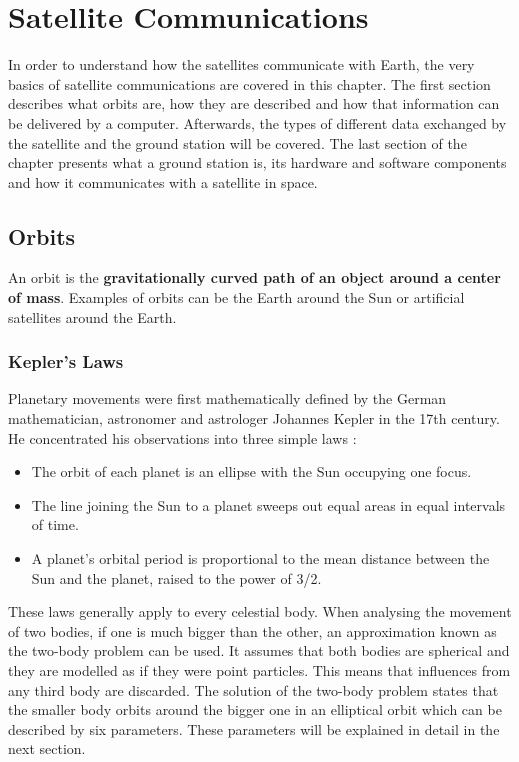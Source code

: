 

\chapter{Satellite Communications}

In order to understand how  the satellites communicate with Earth, the very basics of satellite communications are covered in this chapter. The first section describes what orbits are, how they are described and how that information can be delivered by a computer. Afterwards, the types of different data exchanged by the satellite and the ground station will be covered. The last section of the chapter presents what a ground station is, its hardware and software components and how it communicates with a satellite in space.


\section{Orbits}
An orbit is the \textbf{gravitationally curved path of an object around a center of mass}. Examples of orbits can be the Earth around the Sun or artificial satellites around the Earth.



\subsection{Kepler's Laws}
Planetary movements were first mathematically defined by the German mathematician, astronomer and astrologer Johannes Kepler in the 17th century. He concentrated his observations into three simple laws \citep{SSEng}:
\begin{itemize}

\item The orbit of each planet is an ellipse with the Sun occupying one focus.
\item The line joining the Sun to a planet sweeps out equal areas in equal intervals of time.
\item A planet's orbital period is proportional to the mean distance between the Sun and the planet, raised to the power of 3/2.
\end{itemize} 

These laws generally apply to every celestial body. When analysing the movement of two bodies, if one is much bigger than the other, an approximation known as the two-body problem can be used. It assumes that both bodies are spherical and they are modelled as if they were point particles. This means that influences from any third body are discarded. The solution of the two-body problem states that the smaller body orbits around the bigger one in an elliptical orbit which can be described by six parameters. These parameters will be explained in detail in the next section.


